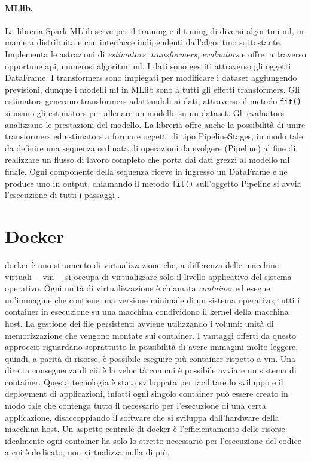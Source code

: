 \documentclass[12pt,a4paper,fleqn,titlepage]{report}
\begin{document}
        \paragraph{MLlib.}
        La libreria Spark MLlib serve per il training e il tuning di diversi algoritmi \gls{ml}, in maniera distribuita e con interfacce indipendenti dall'algoritmo sottostante. Implementa le astrazioni di \emph{estimators}, \emph{transformers}, \emph{evaluators} e offre, attraverso opportune \gls{api}, numerosi algoritmi \gls{ml}. I dati sono gestiti attraverso gli oggetti DataFrame. I transformers sono impiegati per modificare i dataset aggiungendo previsioni, dunque i modelli \gls{ml} in MLlib sono a tutti gli effetti transformers. Gli estimators generano transformers adattandoli ai dati, attraverso il metodo \lstinline{fit()} si usano gli estimators per allenare un modello su un dataset. Gli evaluators analizzano le prestazioni del modello.
        La libreria offre anche la possibilità di unire transformers ed estimators a formare oggetti di tipo PipelineStages, in modo tale da definire una sequenza ordinata di operazioni da svolgere (Pipeline) al fine di realizzare un flusso di lavoro completo che porta dai dati grezzi al modello \gls{ml} finale. Ogni componente della sequenza riceve in ingresso un DataFrame e ne produce uno in output, chiamando il metodo \lstinline{fit()} sull'oggetto Pipeline si avvia l'esecuzione di tutti i passaggi \cite{zecevic:2017}.

    \section{Docker}
        \gls{docker} è uno strumento di virtualizzazione che, a differenza delle macchine virtuali —\gls{vm}— si occupa di virtualizzare solo il livello applicativo del sistema operativo. Ogni unità di virtualizzazione è chiamata \emph{\gls{container}} ed esegue un'immagine che contiene una versione minimale di un sistema operativo; tutti i \gls{container} in esecuzione su una macchina condividono il kernel della macchina host. La gestione dei file persistenti avviene utilizzando i volumi: unità di memorizzazione che vengono montate sui \gls{container}. I vantaggi offerti da questo approccio riguardano soprattutto la possibilità di avere immagini molto leggere, quindi, a parità di risorse, è possibile eseguire più \gls{container} rispetto a \gls{vm}. Una diretta conseguenza di ciò è la velocità con cui è possibile avviare un sistema di \gls{container}.
        Questa tecnologia è stata sviluppata per facilitare lo sviluppo e il deployment di applicazioni, infatti ogni singolo \gls{container} può essere creato in modo tale che contenga tutto il necessario per l'esecuzione di una certa applicazione, disaccoppiando il software che si sviluppa dall'hardware della macchina host. Un aspetto centrale di \gls{docker} è l'efficientamento delle risorse: idealmente ogni \gls{container} ha solo lo stretto necessario per l'esecuzione del codice a cui è dedicato, non virtualizza nulla di più.
\end{document}
